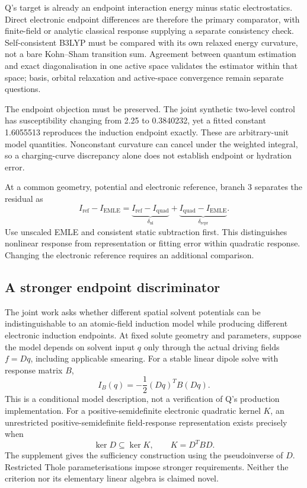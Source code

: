 \documentclass{article}
\begin{document}
Q's target is already an endpoint interaction energy minus static electrostatics. Direct electronic endpoint differences are therefore the primary comparator, with finite-field or analytic classical response supplying a separate consistency check. Self-consistent B3LYP must be compared with its own relaxed energy curvature, not a bare Kohn--Sham transition sum. Agreement between quantum estimation and exact diagonalisation in one active space validates the estimator within that space; basis, orbital relaxation and active-space convergence remain separate questions.

The endpoint objection must be preserved. The joint synthetic two-level control has susceptibility changing from 2.25 to 0.3840232, yet a fitted constant 1.6055513 reproduces the induction endpoint exactly. These are arbitrary-unit model quantities. Nonconstant curvature can cancel under the weighted integral, so a charging-curve discrepancy alone does not establish endpoint or hydration error.

At a common geometry, potential and electronic reference, branch 3 separates the residual as
\begin{equation*}
I_{\mathrm{ref}}-I_{\mathrm{EMLE}}=
\underbrace{I_{\mathrm{ref}}-I_{\mathrm{quad}}}_{\delta_{\mathrm{nl}}}
+\underbrace{I_{\mathrm{quad}}-I_{\mathrm{EMLE}}}_{\delta_{\mathrm{repr}}}.
\end{equation*}
Use unscaled EMLE and consistent static subtraction first. This distinguishes nonlinear response from representation or fitting error within quadratic response. Changing the electronic reference requires an additional comparison.

\subsection{A stronger endpoint discriminator}

The joint work asks whether different spatial solvent potentials can be indistinguishable to an atomic-field induction model while producing different electronic induction endpoints. At fixed solute geometry and parameters, suppose the model depends on solvent input $q$ only through the actual driving fields $f=Dq$, including applicable smearing. For a stable linear dipole solve with response matrix $B$,
\begin{equation*}
I_B(q)=-\frac12(Dq)^TB(Dq).
\end{equation*}
This is a conditional model description, not a verification of Q's production implementation. For a positive-semidefinite electronic quadratic kernel $K$, an unrestricted positive-semidefinite field-response representation exists precisely when
\begin{equation*}
\operatorname{ker}D\subseteq\operatorname{ker}K,\qquad K=D^TBD.
\end{equation*}
The supplement gives the sufficiency construction using the pseudoinverse of $D$. Restricted Thole parameterisations impose stronger requirements. Neither the criterion nor its elementary linear algebra is claimed novel.
\end{document}
